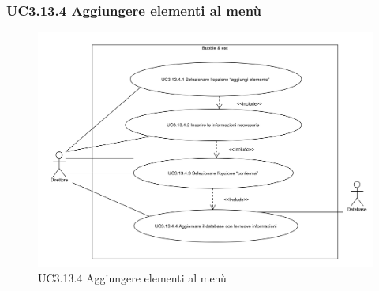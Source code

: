 \subsubsection{UC3.13.4 Aggiungere elementi al menù} \label{UC3.13.4}

\begin{figure}[H]
	\centering
	\includegraphics[width=15cm]{../../documenti/AnalisiDeiRequisiti/Diagrammi_img/uc3_13_4.png}
	\caption{UC3.13.4 Aggiungere elementi al menù}
\end{figure}

